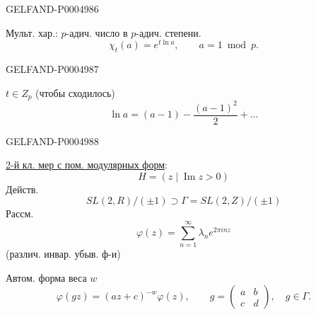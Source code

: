 \begin{GelfandAdjacentEvidence}{GELFAND-P000498}{6}

Мульт. хар.: $p$-адич. число в $p$-адич. степени.
\[
\chi_t(a)=e^{t\ln a},\qquad a=1\bmod p.
\]
\end{GelfandAdjacentEvidence}
\begin{GelfandAdjacentEvidence}{GELFAND-P000498}{7}

\underline{$t\in Z_p$} (чтобы сходилось)
\[
\ln a=(a-1)-\frac{(a-1)^2}{2}+\ldots
\]
\end{GelfandAdjacentEvidence}
\begin{GelfandAdjacentEvidence}{GELFAND-P000498}{8}


\uline{2-й кл. мер с пом. модулярных форм}:
\[
H=(z\mid\operatorname{Im}z>0)
\]
Действ.
\[
SL(2,R)/(\pm1)\supset\Gamma=SL(2,Z)/(\pm1)
\]
Рассм.
\[
\varphi(z)=\sum_{n=1}^{\infty}\lambda_n e^{2\pi inz}
\]
(различ. инвар. убыв. ф-и)

Автом. форма веса $w$
\[
\varphi(gz)=(az+c)^{-w}\varphi(z),\qquad
g=\begin{pmatrix}a&b\\c&d\end{pmatrix},\quad g\in\Gamma.
\]
\end{GelfandAdjacentEvidence}



